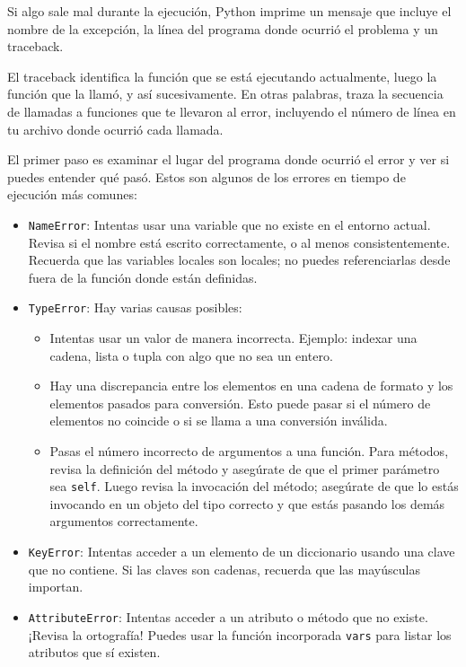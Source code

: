 Si algo sale mal durante la ejecución, Python imprime un mensaje que incluye el nombre de la excepción, la línea del programa donde ocurrió el problema y un traceback.

El traceback identifica la función que se está ejecutando actualmente, luego la función que la llamó, y así sucesivamente. En otras palabras, traza la secuencia de llamadas a funciones que te llevaron al error, incluyendo el número de línea en tu archivo donde ocurrió cada llamada.

El primer paso es examinar el lugar del programa donde ocurrió el error y ver si puedes entender qué pasó. Estos son algunos de los errores en tiempo de ejecución más comunes:

\begin{itemize}
    \item \texttt{NameError}: Intentas usar una variable que no existe en el entorno actual. Revisa si el nombre está escrito correctamente, o al menos consistentemente. Recuerda que las variables locales son locales; no puedes referenciarlas desde fuera de la función donde están definidas.
    
    \item \texttt{TypeError}: Hay varias causas posibles:
    \begin{itemize}
        \item Intentas usar un valor de manera incorrecta. Ejemplo: indexar una cadena, lista o tupla con algo que no sea un entero.
        \item Hay una discrepancia entre los elementos en una cadena de formato y los elementos pasados para conversión. Esto puede pasar si el número de elementos no coincide o si se llama a una conversión inválida.
        \item Pasas el número incorrecto de argumentos a una función. Para métodos, revisa la definición del método y asegúrate de que el primer parámetro sea \texttt{self}. Luego revisa la invocación del método; asegúrate de que lo estás invocando en un objeto del tipo correcto y que estás pasando los demás argumentos correctamente.
    \end{itemize}
    
    \item \texttt{KeyError}: Intentas acceder a un elemento de un diccionario usando una clave que no contiene. Si las claves son cadenas, recuerda que las mayúsculas importan.
    
    \item \texttt{AttributeError}: Intentas acceder a un atributo o método que no existe. ¡Revisa la ortografía! Puedes usar la función incorporada \texttt{vars} para listar los atributos que sí existen.
    

\end{itemize}
